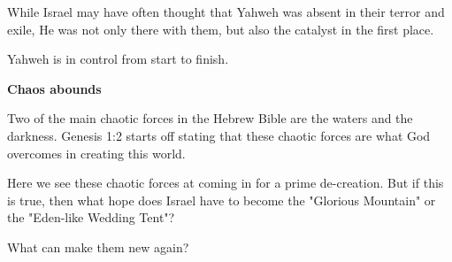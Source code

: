\documentclass[11pt]{article}
\begin{document}
While Israel may have often thought that Yahweh was absent in their terror and exile, He was not only there with them, but also the catalyst in the first place.

{\vspace{1em}}
Yahweh is in control from start to finish.

\vspace{3em}
{\large\bfseries Chaos abounds}
\vspace{1em}

Two of the main chaotic forces in the Hebrew Bible are the waters and the darkness. Genesis 1:2 starts off stating that these chaotic forces are what God overcomes in creating this world.

Here we see these chaotic forces at coming in for a prime de-creation. But if this is true, then what hope does Israel have to become the "Glorious Mountain" or the "Eden-like Wedding Tent"?

{\vspace{1em}}
What can make them new again?
\end{document}
